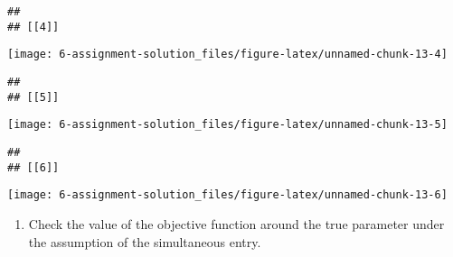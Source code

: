 \documentclass[
]{article}
\providecommand{\tightlist}{%
  \setlength{\itemsep}{0pt}\setlength{\parskip}{0pt}}
\begin{document}
\begin{verbatim}
## 
## [[4]]
\end{verbatim}

\begin{center}\texttt{[image: 6-assignment-solution\_files/figure-latex/unnamed-chunk-13-4]} \end{center}

\begin{verbatim}
## 
## [[5]]
\end{verbatim}

\begin{center}\texttt{[image: 6-assignment-solution\_files/figure-latex/unnamed-chunk-13-5]} \end{center}

\begin{verbatim}
## 
## [[6]]
\end{verbatim}

\begin{center}\texttt{[image: 6-assignment-solution\_files/figure-latex/unnamed-chunk-13-6]} \end{center}

\begin{enumerate}
\def\labelenumi{\arabic{enumi}.}
\setcounter{enumi}{4}
\tightlist
\item
  Check the value of the objective function around the true parameter
  under the assumption of the simultaneous entry.
\end{enumerate}
\end{document}
